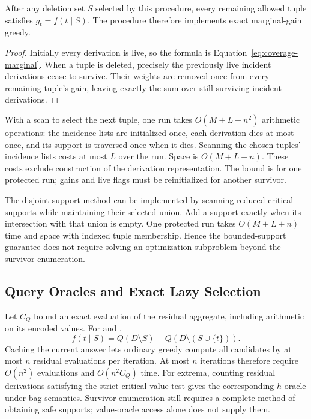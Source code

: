 \begin{proposition}
\label{prop:incremental}
After any deletion set $S$ selected by this procedure, every remaining
allowed tuple satisfies $g_t=f(t\mid S)$. The procedure therefore
implements exact marginal-gain greedy.
\end{proposition}
\begin{proof}
Initially every derivation is live, so the formula is
Equation~\eqref{eq:coverage-marginal}. When a tuple is deleted, precisely
the previously live incident derivations cease to survive. Their weights
are removed once from every remaining tuple's gain, leaving exactly the
sum over still-surviving incident derivations.
\end{proof}

With a scan to select the next tuple, one run takes $O(M+L+n^2)$
arithmetic operations: the incidence lists are initialized once, each
derivation dies at most once, and its support is traversed once when it
dies. Scanning the chosen tuples' incidence lists costs at most $L$ over
the run. Space is $O(M+L+n)$. These costs exclude construction of the
derivation representation. The bound is for one protected run; gains and
live flags must be reinitialized for another survivor.

The disjoint-support method can be implemented by scanning reduced critical
supports while maintaining their selected union. Add a support exactly
when its intersection with that union is empty. One protected run takes
$O(M+L+n)$ time and space with indexed tuple membership. Hence the
bounded-support guarantee does not require solving an optimization
subproblem beyond the survivor enumeration.

\subsection{Query Oracles and Exact Lazy Selection}
\label{sec:query-oracles}

Let $C_Q$ bound an exact evaluation of the residual aggregate, including
arithmetic on its encoded values. For  and ,
\[
f(t\mid S)=Q(D\setminus S)-Q(D\setminus(S\cup\{t\})).
\]
Caching the current answer lets ordinary greedy compute all candidates by
at most $n$ residual evaluations per iteration. At most $n$ iterations
therefore require $O(n^2)$ evaluations and $O(n^2 C_Q)$ time. For extrema,
counting residual derivations satisfying the strict critical-value test
gives the corresponding $h$ oracle under bag semantics. Survivor enumeration
still requires a complete method of obtaining safe supports; value-oracle
access alone does not supply them.

